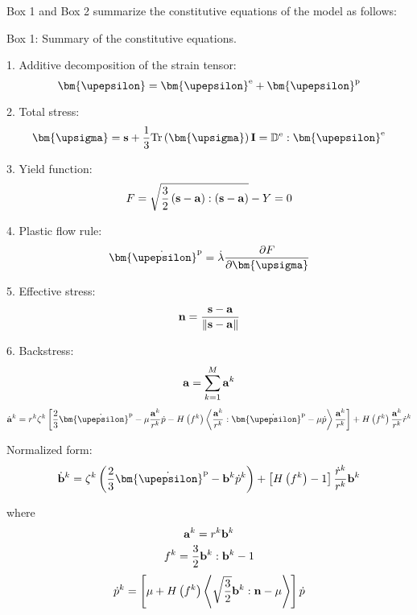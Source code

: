 Box 1 and Box 2 summarize the constitutive equations of the model as follows:

\begin{framed}
\label{Box:1}
Box 1: Summary of the constitutive equations.

1. Additive decomposition of the strain tensor:
\[{\bm{\upepsilon }} = {{\bm{\upepsilon }}^{\rm{e}}} + {{\bm{\upepsilon }}^{\rm{p}}}\]

2. Total stress:
\[{\bm{\upsigma }} = {\bf{s}} + \frac{1}{3}{\rm{Tr}}\left( {\bm{\upsigma }} \right){\bf{I}} = {\mathbb{D}^{\rm{e}}}:{{\bm{\upepsilon }}^{\rm{e}}}\]

3. Yield function:
\[F = \sqrt {\frac{3}{2}\left( {{\bf{s}} - {\bf{a}}} \right):\left( {{\bf{s}} - {\bf{a}}} \right)}  - Y = 0\]

4. Plastic flow rule:
\[{{\bm{\dot \upepsilon }}^{\rm{p}}} = \dot \lambda \frac{{\partial F}}{{\partial {\bm{\upsigma }}}}\]

5. Effective stress:
\[{\bf{n}} = \frac{{{\bf{s}} - {\bf{a}}}}{{\left\| {{\bf{s}} - {\bf{a}}} \right\|}}\]

6. Backstress:
\[{\bf{a}} = \sum\limits_{k = 1}^M {{{\bf{a}}^k}} \]
\[{{\dot{\bf a}}^k} = {r^k}{\zeta ^k}\left[ {\frac{2}{3}{{{\bm{\dot \upepsilon }}}^{\rm{p}}} - \mu \frac{{{{\bf{a}}^k}}}{{{r^k}}}\dot p - H\left( {{f^k}} \right)\left\langle {\frac{{{{\bf{a}}^k}}}{{{r^k}}}:{{{\bm{\dot \upepsilon }}}^{\rm{p}}} - \mu \dot p} \right\rangle \frac{{{{\bf{a}}^k}}}{{{r^k}}}} \right] + H\left( {{f^k}} \right)\frac{{{{\bf{a}}^k}}}{{{r^k}}}{\dot r^k}\]

Normalized form:
\[{{\dot{\bf b}}^k} = {\zeta ^k}\left( {\frac{2}{3}{{{\bm{\dot \upepsilon }}}^{\rm{p}}} - {{\bf{b}}^k}{{\dot p}^k}} \right) + \left[ {H\left( {{f^k}} \right) - 1} \right]\frac{{{{\dot r}^k}}}{{{r^k}}}{{\bf{b}}^k}\]

where
\[{{\bf{a}}^k} = {r^k}{{\bf{b}}^k}\]
\[{f^k} = \frac{3}{2}{{\bf{b}}^k}:{{\bf{b}}^k} - 1\]
\[{\dot p^k} = \left[ {\mu  + H\left( {{f^k}} \right)\left\langle {\sqrt {\frac{3}{2}} {{\bf{b}}^k}:{\bf{n}} - \mu } \right\rangle } \right]\dot p\]
\end{framed}


